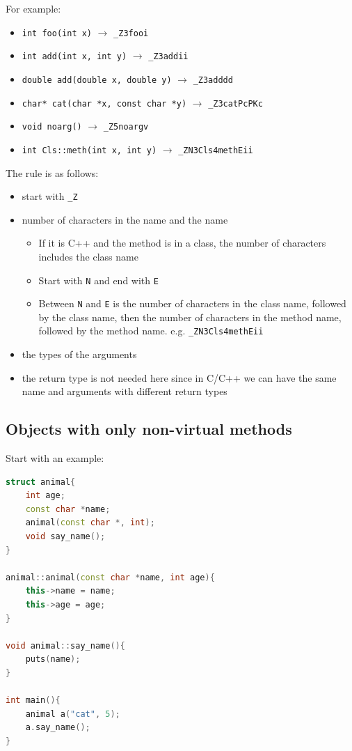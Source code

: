 \documentclass[letterpaper,12pt]{article}
\begin{document}
For example: \begin{itemize}
    \item \texttt{int foo(int x)} $\to$ \texttt{\_Z3fooi}
    \item \texttt{int add(int x, int y)} $\to$ \texttt{\_Z3addii}
    \item \texttt{double add(double x, double y)} $\to$ \texttt{\_Z3adddd}
    \item \texttt{char* cat(char *x, const char *y)} $\to$ \texttt{\_Z3catPcPKc}
    \item \texttt{void noarg()} $\to$ \texttt{\_Z5noargv}
    \item \texttt{int Cls::meth(int x, int y)} $\to$ \texttt{\_ZN3Cls4methEii}
\end{itemize}
The rule is as follows:\begin{itemize}
    \item start with \texttt{\_Z}
    \item number of characters in the name and the name\begin{itemize}
        \item If it is C++ and the method is in a class, the number of characters includes the class name
        \item Start with \texttt{N} and end with \texttt{E}
        \item Between \texttt{N} and \texttt{E} is the number of characters in the class name, followed by the class name, then the number of characters in the method name, followed by the method name. e.g. \texttt{\_ZN3Cls4methEii}
    \end{itemize}
    \item the types of the arguments
    \item the return type is not needed here since in C/C++ we can have the same name and arguments with different return types
\end{itemize}
\subsection{Objects with only non-virtual methods}
Start with an example: \begin{lstlisting}[language=C++]
struct animal{
    int age;
    const char *name;
    animal(const char *, int);
    void say_name();
}

animal::animal(const char *name, int age){
    this->name = name;
    this->age = age;
}

void animal::say_name(){
    puts(name);
}

int main(){
    animal a("cat", 5);
    a.say_name();
}
\end{lstlisting}
\end{document}
